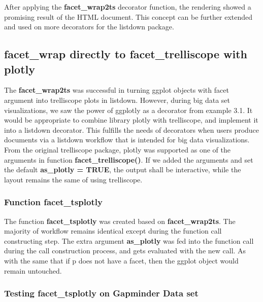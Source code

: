 \documentclass[
]{article}
\begin{document}
After applying the \textbf{facet\_wrap2ts} decorator function, the
rendering showed a promising result of the HTML document. This concept
can be further extended and used on more decorators for the listdown
package.

\hypertarget{facet_wrap-directly-to-facet_trelliscope-with-plotly}{%
\subsection{facet\_wrap directly to facet\_trelliscope with
plotly}\label{facet_wrap-directly-to-facet_trelliscope-with-plotly}}

The \textbf{facet\_wrap2ts} was successful in turning ggplot objects
with facet argument into trelliscope plots in listdown. However, during
big data set visualizations, we saw the power of ggplotly as a decorator
from example 3.1. It would be appropriate to combine library plotly with
trelliscope, and implement it into a listdown decorator. This fulfills
the needs of decorators when users produce documents via a listdown
workflow that is intended for big data visualizations. From the original
trelliscope package, plotly was supported as one of the arguments in
function \textbf{facet\_trelliscope()}. If we added the arguments and
set the default \textbf{as\_plotly = TRUE}, the output shall be
interactive, while the layout remains the same of using trelliscope.

\hypertarget{function-facet_tsplotly}{%
\subsubsection{Function facet\_tsplotly}\label{function-facet_tsplotly}}

The function \textbf{facet\_tsplotly} was created based on
\textbf{facet\_wrap2ts}. The majority of workflow remains identical
except during the function call constructing step. The extra argument
\textbf{as\_plotly} was fed into the function call during the call
construction process, and gets evaluated with the new call. As with the
same that if p does not have a facet, then the ggplot object would
remain untouched.

\hypertarget{testing-facet_tsplotly-on-gapminder-data-set}{%
\subsubsection{Testing facet\_tsplotly on Gapminder Data
set}\label{testing-facet_tsplotly-on-gapminder-data-set}}
\end{document}
